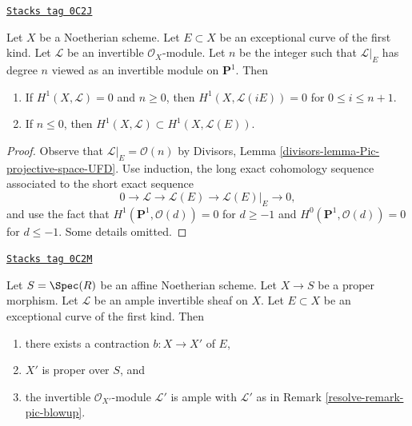 \begin{lemma}
\label{resolve-lemma-lift-sections-and-h1}
\href{https://stacks.math.columbia.edu/tag/0C2J}{\texttt{Stacks tag 0C2J}}

Let $X$ be a Noetherian scheme. Let $E \subset X$ be an
exceptional curve of the first kind. Let $\mathcal{L}$ be
an invertible $\mathcal{O}_X$-module.
Let $n$ be the integer such that $\mathcal{L}|_E$ has degree $n$
viewed as an invertible module on $\mathbf{P}^1$. Then
\begin{enumerate}
\item If $H^1(X, \mathcal{L}) = 0$ and $n \geq 0$, then
$H^1(X, \mathcal{L}(iE)) = 0$ for $0 \leq i \leq n + 1$.
\item If $n \leq 0$, then
$H^1(X, \mathcal{L}) \subset H^1(X, \mathcal{L}(E))$.
\end{enumerate}
\end{lemma}

\begin{proof}
Observe that $\mathcal{L}|_E = \mathcal{O}(n)$ by
Divisors, Lemma \ref{divisors-lemma-Pic-projective-space-UFD}.
Use induction, the long exact cohomology sequence associated to the
short exact sequence
$$
0 \to \mathcal{L} \to \mathcal{L}(E) \to \mathcal{L}(E)|_E \to 0,
$$
and use the fact that $H^1(\mathbf{P}^1, \mathcal{O}(d)) = 0$ for
$d \geq -1$ and $H^0(\mathbf{P}^1, \mathcal{O}(d)) = 0$ for
$d \leq -1$. Some details omitted.
\end{proof}

\begin{lemma}
\label{resolve-lemma-contract-ample}
\href{https://stacks.math.columbia.edu/tag/0C2M}{\texttt{Stacks tag 0C2M}}

Let $S = \Spec(R)$ be an affine Noetherian scheme.
Let $X \to S$ be a proper morphism. Let $\mathcal{L}$ be an
ample invertible sheaf on $X$. Let $E \subset X$ be an
exceptional curve of the first kind. Then
\begin{enumerate}
\item there exists a contraction $b : X \to X'$ of $E$,
\item $X'$ is proper over $S$, and
\item the invertible $\mathcal{O}_{X'}$-module $\mathcal{L}'$
is ample with $\mathcal{L}'$ as in Remark \ref{resolve-remark-pic-blowup}.
\end{enumerate}
\end{lemma}

